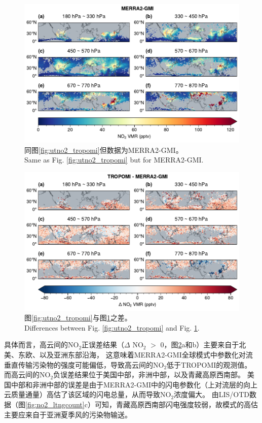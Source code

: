 \begin{figure}[!htbp]
    \centering
    \includegraphics[width=15cm]{./figures/utno2_merra2-gmi.pdf}
    \caption{
    同图\ref{fig:utno2_tropomi}但数据为MERRA2-GMI。 \\
    Same as Fig. \ref{fig:utno2_tropomi} but for MERRA2-GMI.
    }
    \label{fig:utno2_merra2}
\end{figure}

\begin{figure}[!htbp]
    \centering
    \includegraphics[width=15cm]{./figures/utno2_delta.pdf}
    \caption{
    图\ref{fig:utno2_tropomi}与图\ref{fig:utno2_merra2}之差。 \\
    Differences between Fig. \ref{fig:utno2_tropomi} and Fig. \ref{fig:utno2_merra2}.
    }
    \label{fig:utno2_delta}
\end{figure}


具体而言，高云间的NO$_2$正误差结果（$\Delta$ NO$_2$ $>$ 0，图\ref{fig:utno2_delta}a和b）主要来自于北美、东欧、以及亚洲东部沿海，
这意味着MERRA2-GMI全球模式中参数化对流垂直传输污染物的强度可能偏低，导致高云间的NO$_2$低于TROPOMI的观测值。
而高云间的NO$_2$负误差结果位于美国中部，非洲中部，以及青藏高原西南部。
美国中部和非洲中部的误差是由于MERRA2-GMI中的闪电参数化（上对流层的向上云质量通量）高估了该区域的闪电总量，从而导致NO$_2$浓度偏大\citep{Allen.2002,Allen.2010}。
由LIS/OTD数据（图\ref{fig:no2_ltngcount}c）可知，青藏高原西南部闪电强度较弱，故模式的高估主要应来自于亚洲夏季风的污染物输送。

